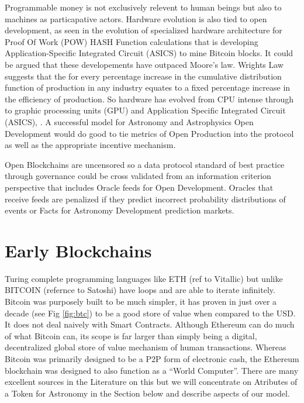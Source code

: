\documentclass[final,5p,times,twocolumn,authoryear]{elsarticle}
\begin{document}
Programmable money is not exclusively relevent to human beings but also to machines as particapative actors. Hardware evolution is also tied to open development, as seen in the evolution of specialized hardware architecture for Proof Of Work (POW) HASH Function calculations that is developing Application-Specific Integrated Circuit (ASICS) to mine Bitcoin blocks. It could be argued that these developements have outpaced Moore's law.  Wrights Law suggests that the for every percentage increase in the cumulative distribution function of production in any industry equates to a fixed percentage increase in the efficiency of production. So hardware has evolved from CPU intense through to graphic processing units (GPU) and  Application Specific Integrated Circuit  (ASICS), \cite{10.1371/journal.pone.0052669}. A successful model for Astronomy and Astrophysics Open Development would do good to tie metrics of Open Production into the protocol as well as the appropriate incentive mechanism.       

Open Blockchains are uncensored so a data protocol standard of best practice through governance could be cross validated from an information criterion perspective that includes Oracle feeds for Open Development.  Oracles that receive feeds are penalized if they predict incorrect probability distributions of events or Facts for Astronomy Development prediction markets. 

\section{Early Blockchains}
Turing complete programming languages like ETH (ref to Vitallic) but unlike BITCOIN  (refernce to Satoshi) have loops and are able to iterate infinitely.  Bitcoin was purposely built to be much simpler, it has proven in just over a decade (see Fig \ref{fig:btc}) to be a good store of value when compared to the USD. It does not deal naively with Smart Contracts. Although Ethereum can do much of what Bitcoin can, its scope is far larger than simply being a digital, decentralized global store of value mechanism of human transactions. Whereas Bitcoin was primarily designed to be a P2P form of electronic cash, the Ethereum blockchain was designed to also function as a “World Computer”. There are many excellent sources in the Literature on this but we will concentrate on Atributes of a Token for Astronomy in the Section below and describe aspects of our model.
 
\end{document}

